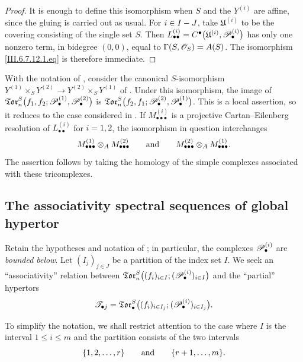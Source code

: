 \begin{proof}
It is enough to define this isomorphism when $S$ and the
$Y^{(i)}$ are affine, since the gluing is carried out as usual.
For $i\in I- J$, take $\mathfrak U^{(i)}$ to be the covering
consisting of the single set $S$.  Then $L_{\bullet\bullet}^{(i)}
=
C^\bullet
\bigl(
\mathfrak U^{(i)},\mathscr{P}_\bullet^{(i)}
\bigr)$
has only one nonzero term, in bidegree $(0,0)$, equal to $\Gamma(S,\mathscr{O}_S)=A(S)$.
The isomorphism \eqref{III.6.7.12.1.eq} is therefore immediate.
\end{proof}

\begin{remark}[6.7.13]
\label{III.6.7.13}
With the notation of , consider the canonical
$S$-isomorphism $Y^{(1)}\times_SY^{(2)}
\longrightarrow
Y^{(2)}\times_SY^{(1)}$
of .  Under this isomorphism, the image of $\mathfrak{Tor}_n^S
\bigl(
f_1,f_2;
\mathscr{P}_\bullet^{(1)},\mathscr{P}_\bullet^{(2)}
\bigr)$
is $\mathfrak{Tor}_n^S
\bigl(
f_2,f_1;
\mathscr{P}_\bullet^{(2)},\mathscr{P}_\bullet^{(1)}
\bigr)$.
This is a local assertion, so it reduces to the case considered in
.  If
$M_{\bullet\bullet\bullet}^{(i)}$ is a projective
Cartan--Eilenberg resolution of $L_{\bullet\bullet}^{(i)}$ for
$i=1,2$, the isomorphism in question interchanges
\[
  M_{\bullet\bullet\bullet}^{(1)}
  \otimes_A
  M_{\bullet\bullet\bullet}^{(2)}
  \qquad\hbox{and}\qquad
  M_{\bullet\bullet\bullet}^{(2)}
  \otimes_A
  M_{\bullet\bullet\bullet}^{(1)}.
\]
The assertion follows by taking the homology of the simple
complexes associated with these tricomplexes.
\end{remark}

\subsection{The associativity spectral sequences of global hypertor}
\label{subsection:III.6.8}
\label{III.6.8}

\begin{env}[6.8.1]
\label{III.6.8.1}
Retain the hypotheses and notation of ; in
particular, the complexes $\mathscr{P}_\bullet^{(i)}$ are \emph{bounded
below}.  Let $(I_j)_{j\in J}$ be a partition of the index set $I$.
We seek an ``associativity'' relation between $\mathfrak{Tor}_n^S
\bigl(
(f_i)_{i\in I};
(\mathscr{P}_\bullet^{(i)})_{i\in I}
\bigr)$
and the ``partial'' hypertors
\[
  \mathscr T_{\bullet j}
  =
  \mathfrak{Tor}_\bullet^S
  \bigl(
    (f_i)_{i\in I_j};
    (\mathscr{P}_\bullet^{(i)})_{i\in I_j}
  \bigr).
\]

To simplify the notation, we shall restrict attention to the case
where $I$ is the interval $1\leq i\leq m$ and the partition
consists of the two intervals
\[
  \{1,2,\ldots,r\}
  \qquad\hbox{and}\qquad
  \{r+1,\ldots,m\}.
\]
\end{env}

